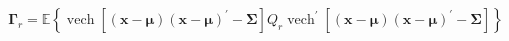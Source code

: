 \begin{equation}
	\boldsymbol{\Gamma}_{r}
	=
	\mathbb{E}
	\left\{
	\operatorname{vech}
	\left[
		\left(
		\boldsymbol{x}
		-
		\boldsymbol{\mu}
		\right)
		\left(
		\boldsymbol{x}
		-
		\boldsymbol{\mu}
		\right)^{\prime}
		-
		\boldsymbol{\Sigma}
	\right]
	Q_{r}
	\operatorname{vech}^{\prime}
	\left[
		\left(
		\boldsymbol{x}
		-
		\boldsymbol{\mu}
		\right)
		\left(
		\boldsymbol{x}
		-
		\boldsymbol{\mu}
		\right)^{\prime}
		-
		\boldsymbol{\Sigma}
	\right]
	\right\}
\end{equation}
